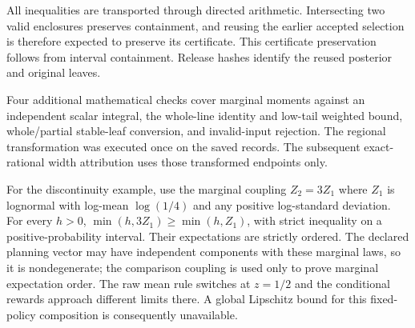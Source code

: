 All inequalities are transported through directed arithmetic. Intersecting two valid enclosures preserves containment, and reusing the earlier accepted selection is therefore expected to preserve its certificate. This certificate preservation follows from interval containment. Release hashes identify the reused posterior and original leaves.

Four additional mathematical checks cover marginal moments against an independent scalar integral, the whole-line identity and low-tail weighted bound, whole/partial stable-leaf conversion, and invalid-input rejection. The regional transformation was executed once on the saved records. The subsequent exact-rational width attribution uses those transformed endpoints only.

For the discontinuity example, use the marginal coupling $Z_2=3Z_1$ where $Z_1$ is lognormal with log-mean $\log(1/4)$ and any positive log-standard deviation. For every $h>0$, $\min(h,3Z_1)\ge\min(h,Z_1)$, with strict inequality on a positive-probability interval. Their expectations are strictly ordered. The declared planning vector may have independent components with these marginal laws, so it is nondegenerate; the comparison coupling is used only to prove marginal expectation order. The raw mean rule switches at $z=1/2$ and the conditional rewards approach different limits there. A global Lipschitz bound for this fixed-policy composition is consequently unavailable.
